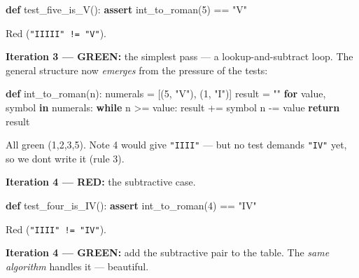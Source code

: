 \documentclass[11pt]{article}
\newenvironment{Shaded}{\begin{snugshade}}{\end{snugshade}}
\newcommand{\ControlFlowTok}[1]{\textcolor[rgb]{0.99,0.74,0.29}{\textbf{#1}}}
\newcommand{\DecValTok}[1]{\textcolor[rgb]{0.96,0.45,0.00}{#1}}
\newcommand{\KeywordTok}[1]{\textcolor[rgb]{0.81,0.81,0.76}{\textbf{#1}}}
\newcommand{\NormalTok}[1]{\textcolor[rgb]{0.81,0.81,0.76}{#1}}
\newcommand{\OperatorTok}[1]{\textcolor[rgb]{0.81,0.81,0.76}{#1}}
\newcommand{\StringTok}[1]{\textcolor[rgb]{0.96,0.31,0.31}{#1}}
\begin{document}

\begin{Shaded}
\begin{Highlighting}[]
\KeywordTok{def}\NormalTok{ test\_five\_is\_V():}
    \ControlFlowTok{assert}\NormalTok{ int\_to\_roman(}\DecValTok{5}\NormalTok{) }\OperatorTok{==} \StringTok{"V"}
\end{Highlighting}
\end{Shaded}

Red (\texttt{"IIIII"\ !=\ "V"}).

\textbf{Iteration 3 --- GREEN:} the simplest pass --- a lookup-and-subtract loop. The general structure now \emph{emerges} from the pressure of the tests:


\begin{Shaded}
\begin{Highlighting}[]
\KeywordTok{def}\NormalTok{ int\_to\_roman(n):}
\NormalTok{    numerals }\OperatorTok{=}\NormalTok{ [(}\DecValTok{5}\NormalTok{, }\StringTok{"V"}\NormalTok{), (}\DecValTok{1}\NormalTok{, }\StringTok{"I"}\NormalTok{)]}
\NormalTok{    result }\OperatorTok{=} \StringTok{""}
    \ControlFlowTok{for}\NormalTok{ value, symbol }\KeywordTok{in}\NormalTok{ numerals:}
        \ControlFlowTok{while}\NormalTok{ n }\OperatorTok{\textgreater{}=}\NormalTok{ value:}
\NormalTok{            result }\OperatorTok{+=}\NormalTok{ symbol}
\NormalTok{            n }\OperatorTok{{-}=}\NormalTok{ value}
    \ControlFlowTok{return}\NormalTok{ result}
\end{Highlighting}
\end{Shaded}

All green (1,2,3,5). Note 4 would give \texttt{"IIII"} --- but no test demands \texttt{"IV"} yet, so we don\textquotesingle t write it (rule 3).

\textbf{Iteration 4 --- RED:} the subtractive case.


\begin{Shaded}
\begin{Highlighting}[]
\KeywordTok{def}\NormalTok{ test\_four\_is\_IV():}
    \ControlFlowTok{assert}\NormalTok{ int\_to\_roman(}\DecValTok{4}\NormalTok{) }\OperatorTok{==} \StringTok{"IV"}
\end{Highlighting}
\end{Shaded}

Red (\texttt{"IIII"\ !=\ "IV"}).

\textbf{Iteration 4 --- GREEN:} add the subtractive pair to the table. The \emph{same algorithm} handles it --- beautiful.
\end{document}
